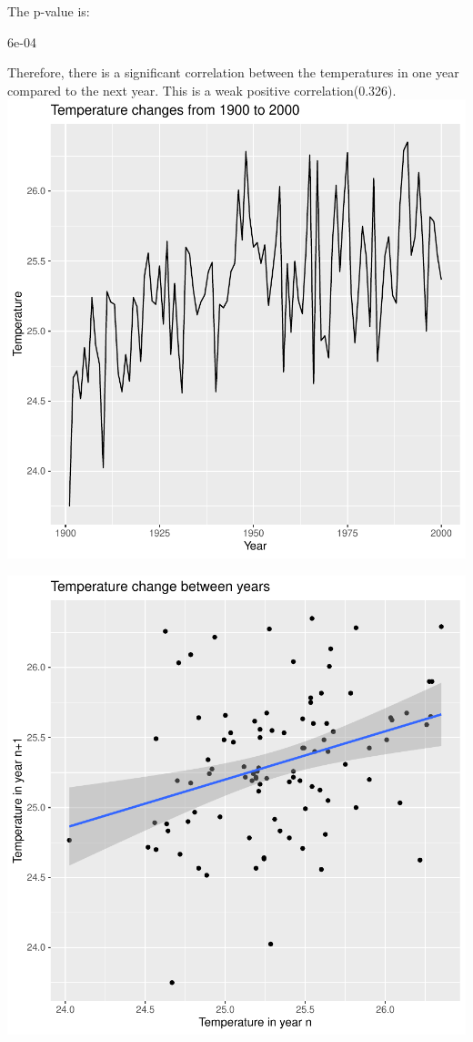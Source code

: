 \documentclass{article}
\begin{document}


The p-value is:
\begin{Schunk}
\begin{Soutput}
[1] 6e-04
\end{Soutput}
\end{Schunk}

Therefore, there is a significant correlation between the temperatures in one year compared to the next year. This is a weak positive correlation(0.326).
\includegraphics{autocorrelation-002}

\includegraphics{autocorrelation-003}
\end{document}
